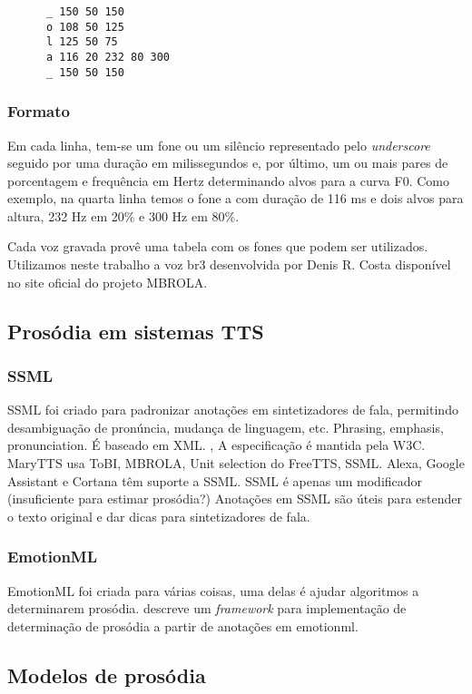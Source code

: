 \begin{lstlisting}
      _ 150 50 150
      o 108 50 125
      l 125 50 75
      a 116 20 232 80 300
      _ 150 50 150
\end{lstlisting}

\subsubsection{Formato}
Em cada linha, tem-se um fone ou um silêncio representado pelo \emph{underscore} seguido por uma duração em milissegundos e, por último, um ou mais pares de porcentagem e frequência em Hertz determinando alvos para a curva F0. Como exemplo, na quarta linha temos o fone \/a\/ com duração de 116 ms e dois alvos para altura, 232 Hz em 20\% e 300 Hz em 80\%.

Cada voz gravada provê uma tabela com os fones que podem ser utilizados. Utilizamos neste trabalho a voz br3 desenvolvida por Denis R. Costa disponível no site oficial do projeto MBROLA.


\subsection{Prosódia em sistemas TTS}
\subsubsection{SSML}
SSML foi criado para padronizar anotações em sintetizadores de fala, permitindo
desambiguação de pronúncia, mudança de linguagem, etc. Phrasing, emphasis, pronunciation. É baseado em XML.
\cite{ssml}, A especificação é mantida pela W3C.
MaryTTS usa ToBI, MBROLA, Unit selection do FreeTTS, SSML.
Alexa, Google Assistant e Cortana têm suporte a SSML.
SSML é apenas um modificador (insuficiente para estimar prosódia?)
Anotações em SSML são úteis para estender o texto original e dar dicas para
sintetizadores de fala.
\subsubsection{EmotionML}
EmotionML \cite{emotionml} foi criada para várias coisas, uma delas é ajudar
algoritmos a determinarem prosódia. \cite{emotionmary} descreve um
\emph{framework} para implementação de determinação de prosódia a partir de
anotações em emotionml.

\subsection{Modelos de prosódia}
